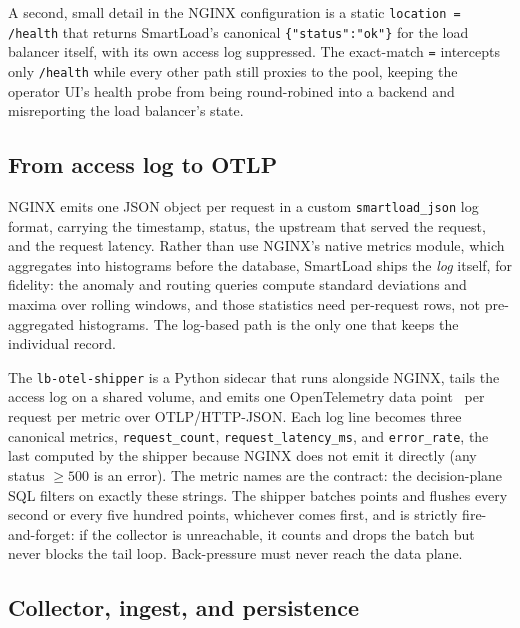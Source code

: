 A second, small detail in the NGINX configuration is a static \texttt{location =
/health} that returns SmartLoad's canonical \texttt{\{"status":"ok"\}} for the load
balancer itself, with its own access log suppressed. The exact-match \texttt{=}
intercepts only \texttt{/health} while every other path still proxies to the pool,
keeping the operator UI's health probe from being round-robined into a backend and
misreporting the load balancer's state.

\subsection{From access log to OTLP}
\label{sec:ima:shipper}

NGINX emits one JSON object per request in a custom \texttt{smartload\_json} log
format, carrying the timestamp, status, the upstream that served the request, and
the request latency. Rather than use NGINX's native metrics module, which
aggregates into histograms before the database, SmartLoad ships the \emph{log}
itself, for fidelity: the anomaly and routing queries compute standard deviations
and maxima over rolling windows, and those statistics need per-request rows, not
pre-aggregated histograms. The log-based path is the only one that keeps the
individual record.

The \texttt{lb-otel-shipper} is a Python sidecar that runs alongside NGINX, tails
the access log on a shared volume, and emits one OpenTelemetry data
point~\cite{opentelemetry} per request per metric over OTLP/HTTP-JSON. Each log
line becomes three canonical metrics, \texttt{request\_count},
\texttt{request\_latency\_ms}, and \texttt{error\_rate}, the last computed by the
shipper because NGINX does not emit it directly (any status $\geq 500$ is an
error). The metric names are the contract: the decision-plane SQL filters on
exactly these strings. The shipper batches points and flushes every second or every
five hundred points, whichever comes first, and is strictly fire-and-forget: if the
collector is unreachable, it counts and drops the batch but never blocks the tail
loop. Back-pressure must never reach the data plane.

\subsection{Collector, ingest, and persistence}
\label{sec:ima:telemetry}

